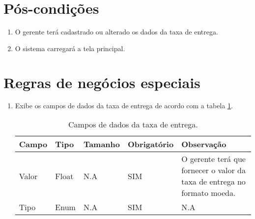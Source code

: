 \section{Pós-condições}

\begin{enumerate}
	\item O gerente terá cadastrado ou alterado os dados da taxa de entrega.
	\item O sistema carregará a tela principal.	
\end{enumerate}

\section{Regras de negócios especiais}

\begin{enumerate}[label=RN\arabic*]
	\item Exibe os campos de dados da taxa de entrega de acordo com a tabela \ref{uc006_tb_rn1}. \label{uc006_rn:1}
	\begin{table}[htb]
		\ABNTEXfontereduzida
		\caption[Campos de dados da taxa de entrega]{Campos de dados da taxa de entrega.}
		\label{uc006_tb_rn1}
		\begin{tabular}{|p{3.0cm}|p{2.0cm}|p{1.5cm}|p{2.0cm}|p{5.75cm}|}
			\hline
			\textbf{Campo} & \textbf{Tipo} & \textbf{Tamanho} & \textbf{Obrigatório} & \textbf{Observação}                                                      \\ \hline
			Valor          & Float         & N.A              & SIM                  & O gerente terá que fornecer o valor da taxa de entrega no formato moeda. \\ \hline
			Tipo           & Enum          & N.A              & SIM                  & N.A                                                                      \\ \hline
		\end{tabular}
	\end{table}
\end{enumerate}